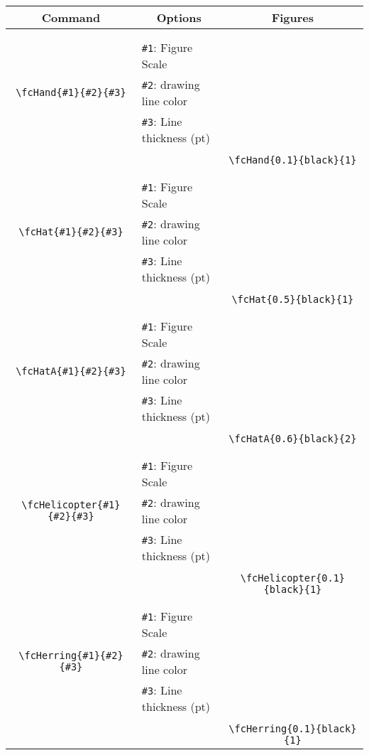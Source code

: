 \documentclass[x11names]{article}
\begin{document}
\begin{table}[H]\centering\begin{tabular}{|c|l|c|}\hline {\bf Command}& \multicolumn{1}{c|}{{\bf Options}} & {\bf Figures}\\  \hline	&&\multirow{5}{*}{\fcHand{0.1}{black}{1}}\\	&&\\	&\verb|#1|: Figure Scale &\\	\verb|\fcHand{#1}{#2}{#3}|&	\verb|#2|: drawing line color &\\	&\verb|#3|: Line thickness (pt) &\\ &&\\&&	\verb|\fcHand{0.1}{black}{1}|\\\hline 	
	&&\multirow{5}{*}{\fcHat{0.5}{black}{1}}\\	&&\\	&\verb|#1|: Figure Scale &\\	\verb|\fcHat{#1}{#2}{#3}|&	\verb|#2|: drawing line color &\\	&\verb|#3|: Line thickness (pt) &\\ &&\\&&	\verb|\fcHat{0.5}{black}{1}|\\\hline 	
	&&\multirow{5}{*}{\fcHatA{0.6}{black}{2}}\\	&&\\	&\verb|#1|: Figure Scale &\\	\verb|\fcHatA{#1}{#2}{#3}|&	\verb|#2|: drawing line color &\\	&\verb|#3|: Line thickness (pt) &\\ &&\\&&	\verb|\fcHatA{0.6}{black}{2}|\\\hline 	
	&&\multirow{5}{*}{\fcHelicopter{0.1}{black}{1}}\\	&&\\	&\verb|#1|: Figure Scale &\\	\verb|\fcHelicopter{#1}{#2}{#3}|&	\verb|#2|: drawing line color &\\	&\verb|#3|: Line thickness (pt) &\\ &&\\&&	\verb|\fcHelicopter{0.1}{black}{1}|\\\hline 	
	&&\multirow{5}{*}{\fcHerring{0.1}{black}{1}}\\	&&\\	&\verb|#1|: Figure Scale &\\	\verb|\fcHerring{#1}{#2}{#3}|&	\verb|#2|: drawing line color &\\	&\verb|#3|: Line thickness (pt) &\\ &&\\&&	\verb|\fcHerring{0.1}{black}{1}|\\\hline 	

\end{tabular}
\end{table}
\end{document}
